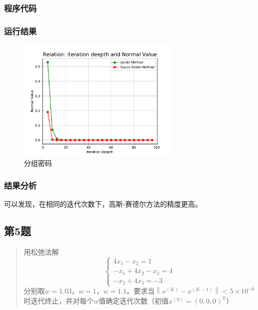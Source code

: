 \subsubsection{程序代码}



\subsubsection{运行结果}

\begin{figure}[H]   %
    \centering
    \includegraphics[width=0.7\textwidth]{../../img/04/compare.pdf}
    \caption{分组密码}
    \label{Fig:分组密码}
\end{figure}

\subsubsection{结果分析}
可以发现，在相同的迭代次数下，高斯-赛德尔方法的精度更高。

\subsection{第5题}
\begin{quote}
    {\kaishu
        用松弛法解
        \begin{equation}
            \left\{\begin{array}{r}{4 x_{1}-x_{2}=1} \\ {-x_{1}+4 x_{2}-x_{3}=4} \\ {-x_{2}+4 x_{3}=-3}\end{array}\right.
        \end{equation}
    }
    分别取$w=1.03$，$w=1$，$w=1.1$。要求当$\left\|x^{(K)}-x^{(K-1)}\right\|<5 \times 10^{-6}$时迭代终止，并对每个$w$值确定迭代次数（初值$x^{(0)}=(0,0,0)^{\mathrm{T}}$）
\end{quote}

